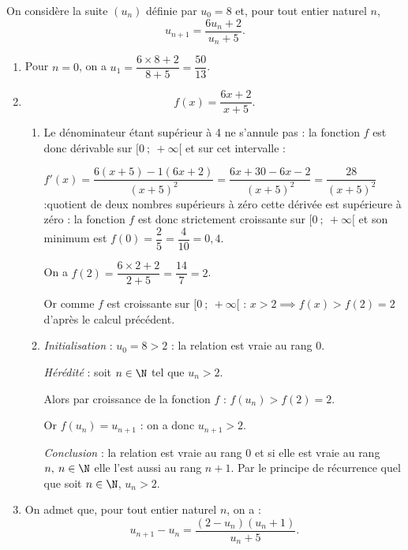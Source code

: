 
\medskip

On considère la suite $\left(u_n\right)$ définie par $u_0 = 8$ et, pour tout entier naturel $n$,
\[u_{n +1} = \dfrac{6u_n + 2}{u_n +5}.\]

\smallskip

\begin{enumerate}
\item %
Pour $n = 0$, on a $u_1 = \dfrac{6 \times 8 + 2}{8 + 5} = \dfrac{50}{13}$.
\item %
\[f(x) = \dfrac{6x + 2 }{x +5}.\]

	\begin{enumerate}
		\item %
		Le dénominateur étant supérieur à 4 ne s'annule pas : la fonction $f$ est donc dérivable sur $[0~;~+\infty[$ et sur cet intervalle :
		
$f'(x) = \dfrac{6(x + 5) - 1(6x + 2)}{(x + 5)^2} = \dfrac{6x + 30 - 6x - 2}{(x + 5)^2} = \dfrac{28}{(x + 5)^2}$ :quotient de deux nombres supérieurs à zéro cette dérivée est supérieure à zéro : la fonction $f$ est donc strictement croissante sur $[0~;~+\infty[$ et son minimum est $f(0) = \dfrac25 = \dfrac{4}{10} = 0,4$.
		
On a $f(2) = \dfrac{6\times 2 + 2}{2 + 5} = \dfrac{14}{7} = 2$.

Or comme $f$ est croissante sur $[0~;~+\infty[$ :
$x > 2 \implies f(x) > f(2) = 2$ d'après le calcul précédent.

		\item %
\emph{Initialisation} : $u_0 = 8 > 2$ : la relation est vraie au rang $0$.
	
\emph{Hérédité} : soit $n \in \N$ tel que $u_n > 2$.

Alors par croissance de la fonction $f$ : $f\left(u_n\right) > f(2) = 2$.

Or $f\left(u_n\right) = u_{n+1}$ : on a donc $u_{n+1} > 2$.

\emph{Conclusion} : la relation est vraie au rang $0$ et si elle est vraie au rang $n, \: n \in \N$ elle l'est aussi au rang $n + 1$. Par le principe de récurrence quel que soit $n \in \N$, \: $u_n > 2$.
	\end{enumerate}
\item On admet que, pour tout entier naturel $n$, on a :
\[u_{n+1} - u_n = \dfrac{\left(2 - u_n\right)\left(u_n + 1\right)}{u_n +5}.\]


\end{enumerate}

